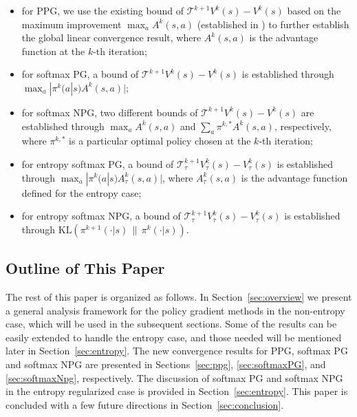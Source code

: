 \begin{itemize}
    \item for PPG, we use the existing bound of $\mathcal{T}^{k+1}V^k(s)-V^k(s)$ based on the maximum improvement $\max_aA^k(s,a)$ (established in \cite{ppgliu}) to further establish the global linear convergence result, where $A^k(s,a)$ is the advantage function at the $k$-th iteration;
    \item for softmax PG,  a bound of $\mathcal{T}^{k+1}V^k(s)-V^k(s)$ is established through $\max_a|\pi^{k}(a|s)A^k(s,a)|$;
    \item for softmax NPG, two different bounds of $\mathcal{T}^{k+1}V^k(s)-V^k(s)$ are established through $\max_aA^k(s,a)$ and $\sum_a\pi^{k,*}A^k(s,a)$, respectively, where $\pi^{k,*}$ is a particular optimal policy chosen at the $k$-th iteration;
    \item for entropy softmax PG, a bound of $\mathcal{T}_\tau^{k+1}V_\tau^k(s)-V_\tau^k(s)$ is established through $\max_a |\pi^k(a|s)A^k_\tau(s,a)|$, where $A^k_\tau(s,a)$ is the advantage function defined for the entropy case;
    \item for entropy softmax NPG,  a bound of $\mathcal{T}_\tau^{k+1}V_\tau^k(s)-V_\tau^k(s)$ is established through $\mathrm{KL}(\pi^{k+1}(\cdot|s)\, \| \, \pi^k(\cdot|s))$.
\end{itemize}
\subsection{Outline of This Paper}
The rest of this paper is organized as follows. In Section~\ref{sec:overview} we present a general analysis framework for the policy gradient methods in the non-entropy case, which will be used in the subsequent sections. Some of the results can be easily extended to handle the entropy case, and those needed will be mentioned later in Section~\ref{sec:entropy}. The new convergence results for PPG, softmax PG and softmax NPG are presented in Sections~\ref{sec:ppg}, \ref{sec:softmaxPG}, and \ref{sec:softmaxNpg}, respectively. The discussion of softmax PG and softmax NPG in the entropy regularized case 
is provided in Section~\ref{sec:entropy}. This paper is concluded with a few future directions in Section~\ref{sec:conclusion}.